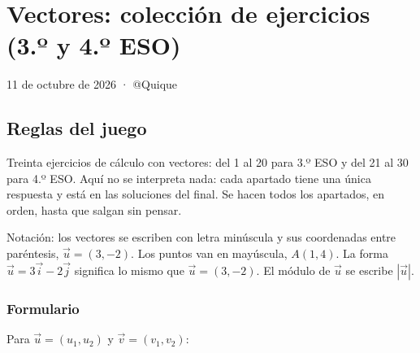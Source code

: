 \section{Vectores: colección de ejercicios (3.º y 4.º ESO)}

11 de octubre de 2026 · @Quique

\subsection{Reglas del juego}

Treinta ejercicios de cálculo con vectores: del 1 al 20 para 3.º ESO y del 21 al 30 para 4.º ESO. Aquí no se interpreta nada: cada apartado tiene una única respuesta y está en las soluciones del final. Se hacen todos los apartados, en orden, hasta que salgan sin pensar.

Notación: los vectores se escriben con letra minúscula y sus coordenadas entre paréntesis, $\vec{u}=(3,-2)$. Los puntos van en mayúscula, $A(1,4)$. La forma $\vec{u}=3\vec{i}-2\vec{j}$ significa lo mismo que $\vec{u}=(3,-2)$. El módulo de $\vec{u}$ se escribe $|\vec{u}|$.

\subsubsection*{Formulario}

Para $\vec{u}=(u_1,u_2)$ y $\vec{v}=(v_1,v_2)$:

